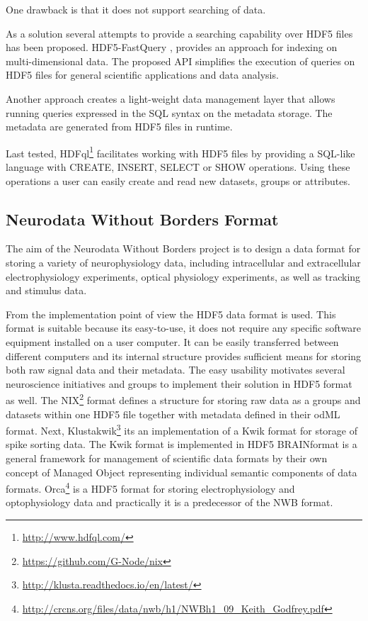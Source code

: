 \documentclass[utf8]{frontiersSCNS} %
\begin{document}
One drawback is that it does not support searching of data.


As a solution several attempts to provide a searching capability over HDF5 files has been proposed. HDF5-FastQuery \citep{1644309}, \citep{6114446} provides an approach for indexing on multi-dimensional data. The proposed API simplifies the execution of queries on HDF5 files for general scientific applications and data analysis.

Another approach \citep{6546110} creates a light-weight data management layer that allows running queries expressed in the SQL syntax on the metadata storage. The metadata are generated from HDF5 files in runtime.

Last tested, HDFql\footnote{\url{http://www.hdfql.com/}} facilitates working with HDF5 files by providing a SQL-like language with CREATE, INSERT, SELECT or SHOW operations. Using these operations a user can easily create and read new datasets, groups or attributes. 


\subsection{Neurodata Without Borders Format}
\label{nwb}

The aim of the Neurodata Without Borders project is to design a data format for storing a variety of neurophysiology data, including intracellular and extracellular electrophysiology experiments, optical physiology experiments, as well as tracking and stimulus data.

From the implementation point of view the HDF5 data format is used. This format is suitable because its easy-to-use, it does not require any specific software equipment installed on a user computer. It can be easily transferred between different computers and its internal structure provides sufficient means for storing both raw signal data and their metadata. The easy usability motivates several neuroscience initiatives and groups to implement their solution in HDF5 format as well. The NIX\footnote{\url{https://github.com/G-Node/nix}} format defines a structure for storing raw data as a groups and datasets within one HDF5 file together with metadata defined in their odML \citep{10.3389/fninf.2011.00016} format. Next,  Klustakwik\footnote{\url{http://klusta.readthedocs.io/en/latest/}} its an implementation of a Kwik format for storage of spike sorting data. The Kwik format is implemented in HDF5 BRAINformat \citep{10.3389/fninf.2016.00048} is a general framework for management of scientific data formats by their own concept of Managed Object representing individual semantic components of data formats.   Orca\footnote{\url{http://crcns.org/files/data/nwb/h1/NWBh1\_09\_Keith\_Godfrey.pdf}} is a HDF5 format for storing electrophysiology and optophysiology data and practically it is a predecessor of the NWB format.
\end{document}
